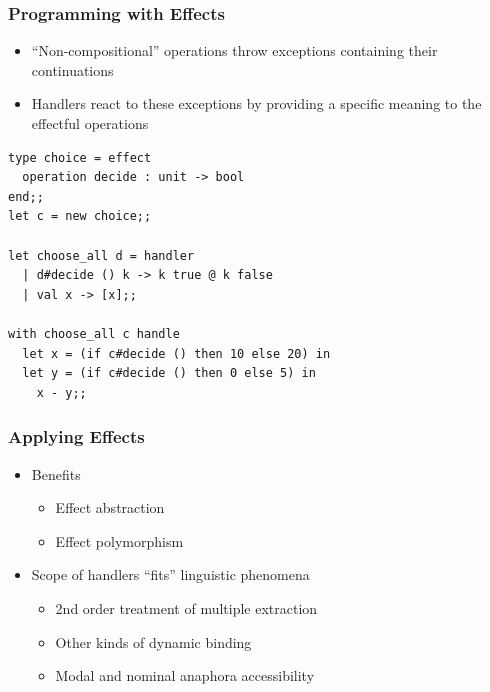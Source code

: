 \documentclass{beamer}
\begin{document}
\begin{frame}[fragile]
  \frametitle{Programming with Effects}

  \begin{itemize}
  \item ``Non-compositional'' operations throw exceptions containing their
  continuations
  \item Handlers react to these exceptions by providing a specific meaning to
    the effectful operations
  \end{itemize}

  \pause

\begin{lstlisting}
type choice = effect
  operation decide : unit -> bool
end;;
let c = new choice;;

let choose_all d = handler
  | d#decide () k -> k true @ k false
  | val x -> [x];;

with choose_all c handle
  let x = (if c#decide () then 10 else 20) in
  let y = (if c#decide () then 0 else 5) in
    x - y;;
\end{lstlisting}
\end{frame}

\begin{frame}
  \frametitle{Applying Effects}

  \begin{itemize}
  \item Benefits
    \begin{itemize}
    \item Effect abstraction
    \item Effect polymorphism
    \end{itemize}
  \vfill
  \item Scope of handlers ``fits'' linguistic phenomena
    \begin{itemize}
    \item 2nd order treatment of multiple extraction
    \item Other kinds of dynamic binding
    \item Modal and nominal anaphora accessibility
    \end{itemize}
  \end{itemize}
\end{frame}

\appendix
{}
\setcounter{finalframe}{\value{framenumber}}
\end{document}
